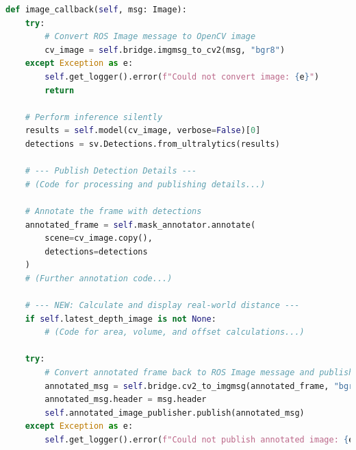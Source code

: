 \begin{lstlisting}[language=Python, caption={Primary image callback and processing logic from \texttt{divot\_detector\_intel.py}.}, label={lst:detector_node}]
def image_callback(self, msg: Image):
    try:
        # Convert ROS Image message to OpenCV image
        cv_image = self.bridge.imgmsg_to_cv2(msg, "bgr8")
    except Exception as e:
        self.get_logger().error(f"Could not convert image: {e}")
        return

    # Perform inference silently
    results = self.model(cv_image, verbose=False)[0]
    detections = sv.Detections.from_ultralytics(results)

    # --- Publish Detection Details ---
    # (Code for processing and publishing details...)

    # Annotate the frame with detections
    annotated_frame = self.mask_annotator.annotate(
        scene=cv_image.copy(),
        detections=detections
    )
    # (Further annotation code...)

    # --- NEW: Calculate and display real-world distance ---
    if self.latest_depth_image is not None:
        # (Code for area, volume, and offset calculations...)
        
    try:
        # Convert annotated frame back to ROS Image message and publish
        annotated_msg = self.bridge.cv2_to_imgmsg(annotated_frame, "bgr8")
        annotated_msg.header = msg.header
        self.annotated_image_publisher.publish(annotated_msg)
    except Exception as e:
        self.get_logger().error(f"Could not publish annotated image: {e}")
\end{lstlisting}
